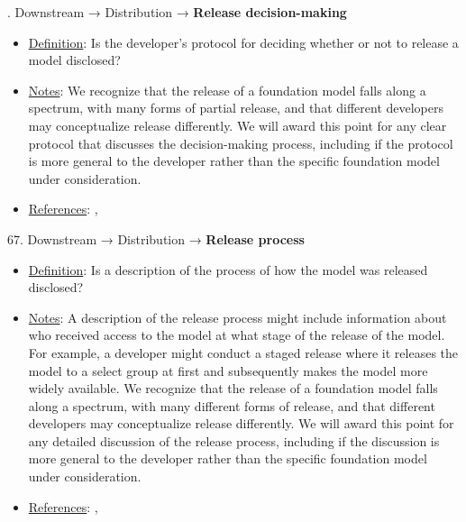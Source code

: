 . Downstream → Distribution → \textbf{Release decision-making}
\vspace{-\parskip}
\begin{itemize}
\item
\underline{Definition}: Is the developer’s protocol for deciding whether or not to release a model disclosed?
\item
\underline{Notes}: We recognize that the release of a foundation model falls along a spectrum, with many forms of partial release, and that different developers may conceptualize release differently. We will award this point for any clear protocol that discusses the decision-making process, including if the protocol is more general to the developer rather than the specific foundation model under consideration.
\item
\underline{References}: \citet{solaiman2023gradient}, \citet{liang2022community-norms}
\end{itemize} \vspace{\baselineskip}


67. Downstream → Distribution → \textbf{Release process}
\vspace{-\parskip}
\begin{itemize}
\item
\underline{Definition}: Is a description of the process of how the model was released disclosed?
\item
\underline{Notes}: A description of the release process might include information about who received access to the model at what stage of the release of the model. For example, a developer might conduct a staged release where it releases the model to a select group at first and subsequently makes the model more widely available. We recognize that the release of a foundation model falls along a spectrum, with many different forms of release, and that different developers may conceptualize release differently. We will award this point for any detailed discussion of the release process, including if the discussion is more general to the developer rather than the specific foundation model under consideration.
\item
\underline{References}: \citet{solaiman2023gradient}, \citet{liang2022community-norms}
\end{itemize} \vspace{\baselineskip}


